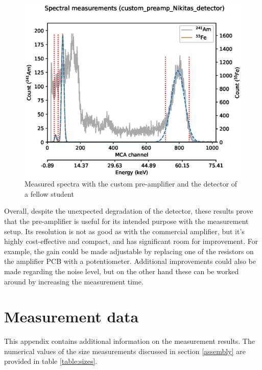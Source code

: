 \documentclass[a4paper]{article}
\begin{document}
\begin{appendices}
\begin{figure}[ht!]
\centering
\includegraphics[width=\textwidth]{fig/python/spectra_custom_preamp_Nikitas_detector}
\caption{Measured spectra with the custom pre-amplifier and the detector of a fellow student}
\label{fig:pre_amp_testing_nikita}
\end{figure}


\FloatBarrier
Overall, despite the unexpected degradation of the detector, these results prove that the pre-amplifier is useful for its intended purpose with the measurement setup.
Its resolution is not as good as with the commercial amplifier, but it's highly cost-effective and compact, and has significant room for improvement.
For example, the gain could be made adjustable by replacing one of the resistors on the amplifier PCB with a potentiometer.
Additional improvements could also be made regarding the noise level, but on the other hand these can be worked around by increasing the measurement time.


\clearpage
\section{Measurement data}
This appendix contains additional information on the measurement results.
The numerical values of the size measurements discussed in section \ref{assembly} are provided in table \ref{table:sizes}.


\end{appendices}
\end{document}
